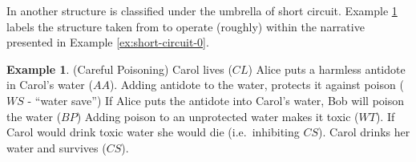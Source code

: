 \documentclass[11pt,a4paper]{book}
\theoremstyle{definition}
\theoremstyle{definition}
\newtheorem{example}{Example}[section]
\theoremstyle{definition}
\theoremstyle{remark}
\newcommand{\hpu}{\texttt{HP-05}}
\newcommand{\ptc}{\texttt{PTC}}
\newcommand{\hpm}{\texttt{HP-15 }}
\newcommand{\hpuc}{\texttt{HP-05c }}
\newcommand{\bvcm}{\texttt{BV-CM}}
\newcommand{\bci}{\texttt{BCI}}
\newcommand{\scacc}{\texttt{SC-ACC}}
\newcommand{\pcps}{\texttt{PCPS}}
\newcommand{\at}{\texttt{AT}}
\newcommand{\sccf}{\texttt{SC-CF}}
\begin{document}

In \parencite{baumgartner2013regularity} another structure is classified under the umbrella of short circuit.
Example \ref{ex:short-circuit-1} labels the structure taken from \parencite{baumgartner2013regularity} to operate (roughly) within the narrative presented in Example \ref{ex:short-circuit-0}.


\begin{example}(Careful Poisoning)
\label{ex:short-circuit-1}
Carol lives ($CL$)
Alice puts a harmless antidote in Carol's water ($AA$). 
Adding antidote to the water, protects it against poison ($WS$ - ``water save'')
If Alice puts the antidote into Carol's water, Bob will poison the water ($BP$)
Adding poison to an unprotected water makes it toxic ($WT$).
If Carol would drink toxic water she would die (i.e.\ inhibiting $CS$).
Carol drinks her water and survives ($CS$).
%
\begin{center}
\end{center}
\end{example}
\end{document}
